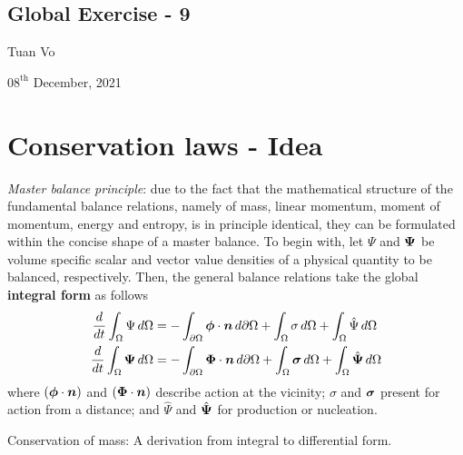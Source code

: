 \documentclass[12pt]{article}
\begin{document}
\begin{center}
	\section*{Global Exercise - 9}
\end{center}
\begin{center}
	Tuan Vo
\end{center}
\begin{center}
	$08^{\text{th}}$ December, 2021
\end{center}
\section{Conservation laws - Idea}
\emph{Master balance principle}: due to the fact that the mathematical structure of the fundamental balance relations,
namely of mass, linear momentum, moment of momentum, energy and entropy, is in principle identical, they can be 
formulated within the concise shape of a master balance. To begin with, let $\Psi$ and ${\boldsymbol{\Psi}}$ be volume specific
scalar and vector value densities of a physical quantity to be balanced, respectively. Then, the general balance relations take 
the global \textbf{integral form} as follows 
\begin{align}
	\frac{d}{dt}\int_{\Omega} \Psi \,d\Omega  & = 
	-\int_{\partial\Omega}{\boldsymbol{\phi}}\cdot{\boldsymbol{\mathnormal n}}\,d\partial\Omega 
	+ \int_{\Omega}\sigma\,d\Omega
	+ \int_{\Omega}\hat{\Psi}\,d\Omega             \\
	\frac{d}{dt}\int_{\Omega} {\boldsymbol{\Psi}} \,d\Omega & = 
	-\int_{\partial\Omega}{\boldsymbol{\Phi}}\cdot{\boldsymbol{\mathnormal n}}\,d\partial\Omega 
	+ \int_{\Omega}{\boldsymbol{\sigma}}\,d\Omega
	+ \int_{\Omega}\hat{{\boldsymbol{\Psi}}}\,d\Omega
\end{align}
where $({\boldsymbol{\phi}}\cdot{\boldsymbol{\mathnormal n}})$ and $({\boldsymbol{\Phi}}\cdot{\boldsymbol{\mathnormal n}})$ describe action at the vicinity; $\sigma$ and 
${\boldsymbol{\sigma}}$ present for action from a distance; and $\hat{\Psi}$ and $\hat{{\boldsymbol{\Psi}}}$ for production or nucleation.
\begin{example}
	Conservation of mass: A derivation from integral to differential form.
\end{example}
\end{document}
